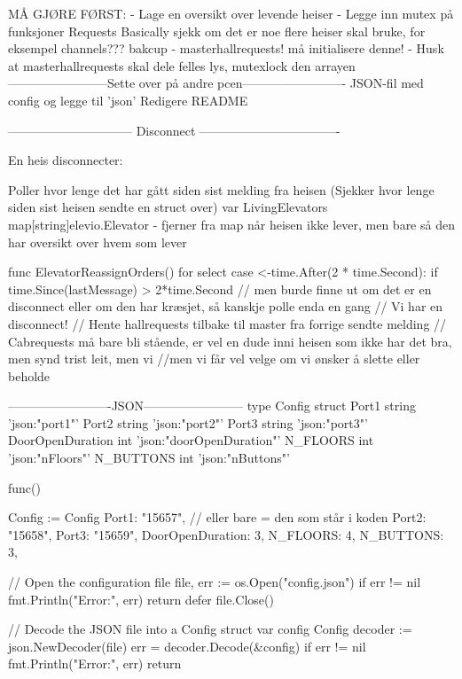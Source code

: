 MÅ GJØRE FØRST:
- Lage en oversikt over levende heiser
- Legge inn mutex på funksjoner
    Requests
    Basically sjekk om det er noe flere heiser skal bruke, for eksempel channels??? bakcup - masterhallrequests! må initialisere denne!
- Husk at masterhallrequests skal dele felles lys, mutexlock den arrayen
------------------------Sette over på andre pcen-------------------------
JSON-fil med config og legge til 'json'
Redigere README


------------------------------ Disconnect ----------------------------------

En heis disconnecter:

Poller hvor lenge det har gått siden sist melding fra heisen (Sjekker hvor lenge siden sist heisen sendte en struct over)
var LivingElevators map[string]elevio.Elevator - fjerner fra map når heisen ikke lever, men bare så den har oversikt over hvem som lever

func ElevatorReassignOrders() {
    for {
        select {
        case <-time.After(2 * time.Second):
            if time.Since(lastMessage) > 2*time.Second { // men burde finne ut om det er en disconnect eller om den har kræsjet, så kanskje polle enda en gang
                // Vi har en disconnect!
                // Hente hallrequests tilbake til master fra forrige sendte melding
                // Cabrequests må bare bli stående, er vel en dude inni heisen som ikke har det bra, men synd trist leit, men vi 
                        //men vi får vel velge om vi ønsker å slette eller beholde
            }
        }
    }
}

-------------------------JSON------------------------
type Config struct {
    Port1 string            'json:"port1"'
    Port2 string            'json:"port2"'
    Port3 string            'json:"port3"'
    DoorOpenDuration int   'json:"doorOpenDuration"'
    N_FLOORS int            'json:"nFloors"'
    N_BUTTONS int          'json:"nButtons"'
} 


func(){

Config := Config{
    Port1: "15657", // eller bare = den som står i koden
    Port2: "15658",
    Port3: "15659",
    DoorOpenDuration: 3,
    N_FLOORS: 4,
    N_BUTTONS: 3,
}

    // Open the configuration file
    file, err := os.Open("config.json")
    if err != nil {
        fmt.Println("Error:", err)
        return
    }
    defer file.Close()

    // Decode the JSON file into a Config struct
    var config Config
    decoder := json.NewDecoder(file)
    err = decoder.Decode(&config)
    if err != nil {
        fmt.Println("Error:", err)
        return
    }
}

